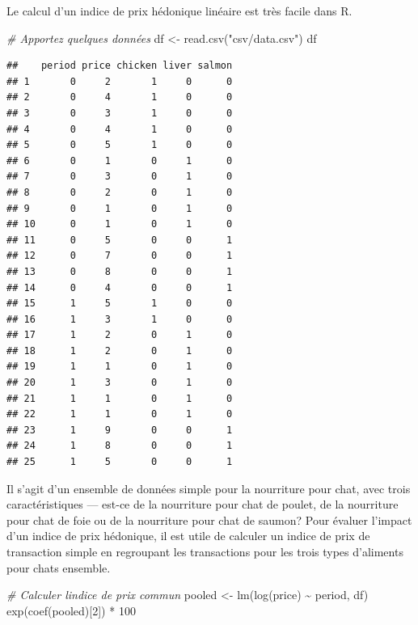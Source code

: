 \documentclass[
]{article}
\newenvironment{Shaded}{\begin{snugshade}}{\end{snugshade}}
\newcommand{\CommentTok}[1]{\textcolor[rgb]{0.56,0.35,0.01}{\textit{#1}}}
\newcommand{\DecValTok}[1]{\textcolor[rgb]{0.00,0.00,0.81}{#1}}
\newcommand{\FunctionTok}[1]{\textcolor[rgb]{0.00,0.00,0.00}{#1}}
\newcommand{\NormalTok}[1]{#1}
\newcommand{\OtherTok}[1]{\textcolor[rgb]{0.56,0.35,0.01}{#1}}
\newcommand{\SpecialCharTok}[1]{\textcolor[rgb]{0.00,0.00,0.00}{#1}}
\newcommand{\StringTok}[1]{\textcolor[rgb]{0.31,0.60,0.02}{#1}}
\begin{document}
Le calcul d'un indice de prix hédonique linéaire est très facile dans R.

\begin{Shaded}
\begin{Highlighting}[]
\CommentTok{\# Apportez quelques données}
\NormalTok{df }\OtherTok{\textless{}{-}} \FunctionTok{read.csv}\NormalTok{(}\StringTok{"csv/data.csv"}\NormalTok{)}
\NormalTok{df}
\end{Highlighting}
\end{Shaded}

\begin{verbatim}
##    period price chicken liver salmon
## 1       0     2       1     0      0
## 2       0     4       1     0      0
## 3       0     3       1     0      0
## 4       0     4       1     0      0
## 5       0     5       1     0      0
## 6       0     1       0     1      0
## 7       0     3       0     1      0
## 8       0     2       0     1      0
## 9       0     1       0     1      0
## 10      0     1       0     1      0
## 11      0     5       0     0      1
## 12      0     7       0     0      1
## 13      0     8       0     0      1
## 14      0     4       0     0      1
## 15      1     5       1     0      0
## 16      1     3       1     0      0
## 17      1     2       0     1      0
## 18      1     2       0     1      0
## 19      1     1       0     1      0
## 20      1     3       0     1      0
## 21      1     1       0     1      0
## 22      1     1       0     1      0
## 23      1     9       0     0      1
## 24      1     8       0     0      1
## 25      1     5       0     0      1
\end{verbatim}

Il s'agit d'un ensemble de données simple pour la nourriture pour chat, avec trois caractéristiques --- est-ce de la nourriture pour chat de poulet, de la nourriture pour chat de foie ou de la nourriture pour chat de saumon? Pour évaluer l'impact d'un indice de prix hédonique, il est utile de calculer un indice de prix de transaction simple en regroupant les transactions pour les trois types d'aliments pour chats ensemble.

\begin{Shaded}
\begin{Highlighting}[]
\CommentTok{\# Calculer l\textquotesingle{}indice de prix commun}
\NormalTok{pooled }\OtherTok{\textless{}{-}} \FunctionTok{lm}\NormalTok{(}\FunctionTok{log}\NormalTok{(price) }\SpecialCharTok{\textasciitilde{}}\NormalTok{ period, df)}
\FunctionTok{exp}\NormalTok{(}\FunctionTok{coef}\NormalTok{(pooled)[}\DecValTok{2}\NormalTok{]) }\SpecialCharTok{*} \DecValTok{100}
\end{Highlighting}
\end{Shaded}
\end{document}

